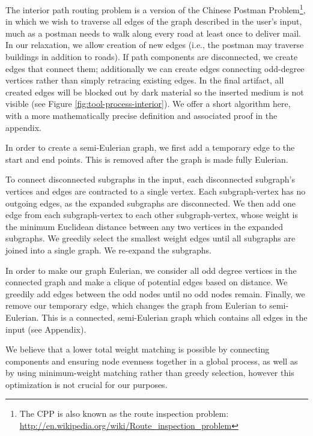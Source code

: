 The interior path routing problem is a version of the Chinese Postman Problem\footnote{The CPP is also known as the route inspection problem: \url{http://en.wikipedia.org/wiki/Route_inspection_problem}}, in which we wish to traverse all edges of the graph described in the user's input, much as a postman needs to walk along every road at least once to deliver mail.  In our relaxation, we allow creation of new edges (i.e., the postman may traverse buildings in addition to roads).  If path components are disconnected, we create edges that connect them; additionally we can create edges connecting odd-degree vertices rather than simply retracing existing edges.  In the final artifact, all created edges will be blocked out by dark material so the inserted medium is not visible (see Figure \ref{fig:tool-process-interior}).  We offer a short algorithm here, with a more mathematically precise definition and associated proof in the appendix.

In order to create a semi-Eulerian graph, we first add a temporary edge to the start and end points.  This is removed after the graph is made fully Eulerian.

To connect disconnected subgraphs in the input, each disconnected subgraph's vertices and edges are contracted to a single vertex.  Each subgraph-vertex has no outgoing edges, as the expanded subgraphs are disconnected.  We then add one edge from each subgraph-vertex to each other subgraph-vertex, whose weight is the minimum Euclidean distance between any two vertices in the expanded subgraphs.  We greedily select the smallest weight edges until all subgraphs are joined into a single graph.  We re-expand the subgraphs.

In order to make our graph Eulerian, we consider all odd degree vertices in the connected graph and make a clique of potential edges based on distance.  We greedily add edges between the odd nodes until no odd nodes remain.  Finally, we remove our temporary edge, which changes the graph from Eulerian to semi-Eulerian.  This is a connected, semi-Eulerian graph which contains all edges in the input (see Appendix).

We believe that a lower total weight matching is possible by connecting components and ensuring node evenness together in a global process, as well as by using minimum-weight matching rather than greedy selection, however this optimization is not crucial for our purposes.

